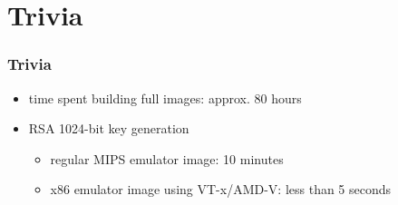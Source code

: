 \documentclass{beamer}
\begin{document}
	
\section{Trivia}
	\begin{frame}
		\tableofcontents[currentsection]
	\end{frame}
	\begin{frame}
	\frametitle{Trivia}
		\begin{itemize}
			\item time spent building full images: approx. 80 hours
			\item RSA 1024-bit key generation
				\begin{itemize}
					\item regular MIPS emulator image: 10 minutes
					\item x86 emulator image using VT-x/AMD-V: less than 5 seconds
				\end{itemize}
		\end{itemize}
	\end{frame}
\end{document}
